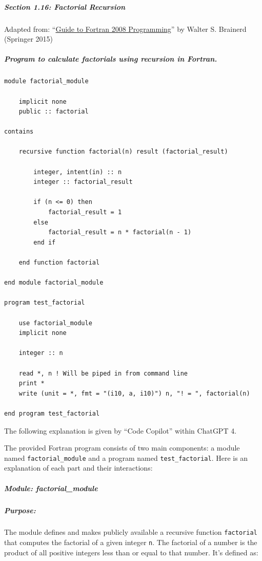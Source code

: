 \subparagraph{Section 1.16: Factorial Recursion}

Adapted from: ``\href{https://www.amazon.com/Guide-Fortran-Programming-Walter-brainerd/dp/1447167589/ref=sr\_1\_1?crid=JARCJZJ2KJZN\&keywords=guide+to+fortran+2008+programming\&qid=1581908665\&sprefix=guide+to+fortran+2008+programming\%2Caps\%2C189\&sr=8-1}{Guide to Fortran 2008 Programming}'' by Walter S. Brainerd (Springer 2015)

\subparagraph{Program to calculate factorials using recursion in Fortran.}

\begin{verbatim}
module factorial_module

    implicit none
    public :: factorial

contains

    recursive function factorial(n) result (factorial_result)

        integer, intent(in) :: n
        integer :: factorial_result

        if (n <= 0) then
            factorial_result = 1
        else
            factorial_result = n * factorial(n - 1)
        end if

    end function factorial

end module factorial_module

program test_factorial
    
    use factorial_module
    implicit none

    integer :: n

    read *, n ! Will be piped in from command line
    print *
    write (unit = *, fmt = "(i10, a, i10)") n, "! = ", factorial(n)

end program test_factorial
\end{verbatim}

The following explanation is given by ``Code Copilot'' within ChatGPT 4.

The provided Fortran program consists of two main components: a module named \texttt{factorial\_module} and a program named \texttt{test\_factorial}. Here is an explanation of each part and their interactions:

\subparagraph{Module: factorial\_module}

\subparagraph{Purpose:}

The module defines and makes publicly available a recursive function \texttt{factorial} that computes the factorial of a given integer \texttt{n}. The factorial of a number is the product of all positive integers less than or equal to that number. It's defined as:


